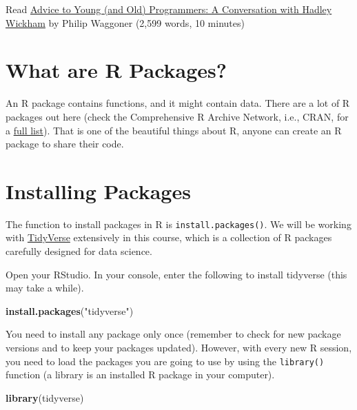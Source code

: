 \documentclass[
]{book}
\newenvironment{Shaded}{\begin{snugshade}}{\end{snugshade}}
\newcommand{\KeywordTok}[1]{\textcolor[rgb]{0.13,0.29,0.53}{\textbf{#1}}}
\newcommand{\NormalTok}[1]{#1}
\newcommand{\StringTok}[1]{\textcolor[rgb]{0.31,0.60,0.02}{#1}}
\begin{document}
Read \href{https://www.r-bloggers.com/advice-to-young-and-old-programmers-a-conversation-with-hadley-wickham/}{Advice to Young (and Old) Programmers: A Conversation with Hadley Wickham} by Philip Waggoner (2,599 words, 10 minutes)

\hypertarget{what-are-r-packages}{%
\section{What are R Packages?}\label{what-are-r-packages}}

An R package contains functions, and it might contain data. There are a lot of R packages out here (check the Comprehensive R Archive Network, i.e., CRAN, for a \href{https://cran.r-project.org/web/packages/available_packages_by_name.html}{full list}). That is one of the beautiful things about R, anyone can create an R package to share their code.

\hypertarget{installing-packages}{%
\section{Installing Packages}\label{installing-packages}}

The function to install packages in R is \texttt{install.packages()}. We will be working with \href{https://www.tidyverse.org/}{TidyVerse} extensively in this course, which is a collection of R packages carefully designed for data science.

Open your RStudio. In your console, enter the following to install tidyverse (this may take a while).

\begin{Shaded}
\begin{Highlighting}[]
\KeywordTok{install.packages}\NormalTok{(}\StringTok{"tidyverse"}\NormalTok{)}
\end{Highlighting}
\end{Shaded}

You need to install any package only once (remember to check for new package versions and to keep your packages updated). However, with every new R session, you need to load the packages you are going to use by using the \texttt{library()} function (a library is an installed R package in your computer).

\begin{Shaded}
\begin{Highlighting}[]
\KeywordTok{library}\NormalTok{(tidyverse)}
\end{Highlighting}
\end{Shaded}
\end{document}
